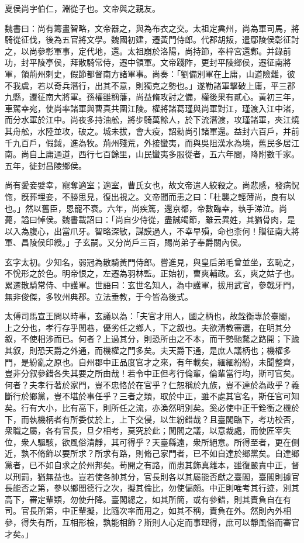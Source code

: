 
\begin{pinyinscope}
夏侯尚字伯仁，淵從子也。文帝與之親友。

魏書曰：尚有籌畫智略，文帝器之，與為布衣之交。太祖定兾州，尚為軍司馬，將騎從征伐，後為五官將文學。魏國初建，遷黃門侍郎。代郡胡叛，遣鄢陵侯彰征討之，以尚參彰軍事，定代地，還。太祖崩於洛陽，尚持節，奉梓宮還鄴。并錄前功，封平陵亭侯，拜散騎常侍，遷中領軍。文帝踐阼，更封平陵鄉侯，遷征南將軍，領荊州刺史，假節都督南方諸軍事。尚奏：「劉備別軍在上庸，山道險難，彼不我虞，若以奇兵潛行，出其不意，則獨克之勢也。」遂勒諸軍擊破上庸，平三郡九縣，遷征南大將軍。孫權雖稱藩，尚益脩攻討之備，權後果有貳心。黃初三年，車駕幸宛，使尚率諸軍與曹真共圍江陵。權將諸葛瑾與尚軍對江，瑾渡入江中渚，而分水軍於江中。尚夜多持油舩，將步騎萬餘人，於下流潛渡，攻瑾諸軍，夾江燒其舟舩，水陸並攻，破之。城未拔，會大疫，詔勑尚引諸軍還。益封六百戶，并前千九百戶，假鉞，進為牧。荊州殘荒，外接蠻夷，而與吳阻漢水為境，舊民多居江南。尚自上庸通道，西行七百餘里，山民蠻夷多服從者，五六年間，降附數千家。五年，徙封昌陵鄉侯。

尚有愛妾嬖幸，寵奪適室；適室，曹氏女也，故文帝遣人絞殺之。尚悲感，發病怳惚，旣葬埋妾，不勝思見，復出視之。文帝聞而恚之曰：「杜襲之輕薄尚，良有以也。」然以舊臣，恩寵不衰。六年，尚疾篤，還京都，帝數臨幸，執手涕泣。尚薨，謚曰悼侯。魏書載詔曰：「尚自少侍從，盡誠竭節，雖云異姓，其猶骨肉，是以入為腹心，出當爪牙。智略深敏，謀謨過人，不幸早殞，命也柰何！贈征南大將軍、昌陵侯印綬。」子玄嗣。又分尚戶三百，賜尚弟子奉爵關內侯。

玄字太初。少知名，弱冠為散騎黃門侍郎。嘗進見，與皇后弟毛曾並坐，玄恥之，不恱形之於色。明帝恨之，左遷為羽林監。正始初，曹爽輔政。玄，爽之姑子也。累遷散騎常侍、中護軍。世語曰：玄世名知人，為中護軍，拔用武官，參戟牙門，無非俊傑，多牧州典郡。立法垂教，于今皆為後式。

太傅司馬宣王問以時事，玄議以為：「夫官才用人，國之柄也，故銓衡專於臺閣，上之分也，孝行存乎閭巷，優劣任之鄉人，下之叙也。夫欲清教審選，在明其分叙，不使相涉而已。何者？上過其分，則恐所由之不本，而干勢馳騖之路開；下踰其叙，則恐天爵之外通，而機權之門多矣。夫天爵下通，是庶人議柄也；機權多門，是紛亂之原也。自州郡中正品度官才之來，有年載矣，緬緬紛紛，未聞整齊，豈非分叙參錯各失其要之所由哉！若令中正但考行倫輩，倫輩當行均，斯可官矣。何者？夫孝行著於家門，豈不忠恪於在官乎？仁恕稱於九族，豈不達於為政乎？義斷行於鄉黨，豈不堪於事任乎？三者之類，取於中正，雖不處其官名，斯任官可知矣。行有大小，比有高下，則所任之流，亦渙然明別矣。奚必使中正干銓衡之機於下，而執機柄者有所委仗於上，上下交侵，以生紛錯哉？且臺閣臨下，考功校否，衆職之屬，各有官長，旦夕相考，莫究於此；閭閻之議，以意裁處，而使匠宰失位，衆人驅駭，欲風俗清靜，其可得乎？天臺縣遠，衆所絕意。所得至者，更在側近，孰不脩飾以要所求？所求有路，則脩己家門者，已不如自達於鄉黨矣。自達鄉黨者，已不如自求之於州邦矣。苟開之有路，而患其飾真離本，雖復嚴責中正，督以刑罰，猶無益也。豈若使各帥其分，官長則各以其屬能否獻之臺閣，臺閣則據官長能否之第，參以鄉閭德行之次，擬其倫比，勿使偏頗。中正則唯考其行迹，別其高下，審定輩類，勿使升降。臺閣總之，如其所簡，或有參錯，則其責負自在有司。官長所第，中正輩擬，比隨次率而用之，如其不稱，責負在外。然則內外相參，得失有所，互相形檢，孰能相飾？斯則人心定而事理得，庶可以靜風俗而審官才矣。」


\end{pinyinscope}
